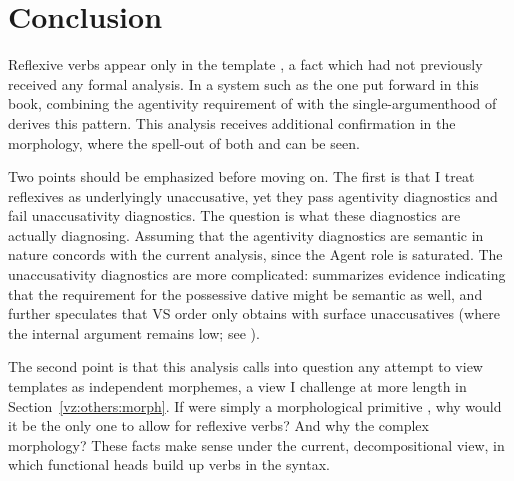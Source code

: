 {\section{Conclusion} \label{vz:conc}

Reflexive verbs appear only in the template {\thit}, a fact which had not previously received any formal analysis. In a system such as the one put forward in this book, combining the agentivity requirement of {\va} with the single-argumenthood of {\vz} derives this pattern. This analysis receives additional confirmation in the morphology, where the spell-out of both {\va} and {\vz} can be seen.

Two points should be emphasized before moving on. The first is that I treat reflexives as underlyingly unaccusative, yet they pass agentivity diagnostics and fail unaccusativity diagnostics. The question is what these diagnostics are actually diagnosing. Assuming that the agentivity diagnostics are semantic in nature concords with the current analysis, since the Agent role is saturated. The unaccusativity diagnostics are more complicated: \cite{kastner17gjgl} summarizes evidence indicating that the requirement for the possessive dative might be semantic as well, and further speculates that VS order only obtains with surface unaccusatives (where the internal argument remains low; see \citealt{unaccusativity95}).

The second point is that this analysis calls into question any attempt to view templates as independent morphemes, a view I challenge at more length in Section~\ref{vz:others:morph}. If {\thit} were simply a morphological primitive \citep{reinhartsiloni05}, why would it be the only one to allow for reflexive verbs? And why the complex morphology? These facts make sense under the current, decompositional view, in which functional heads build up verbs in the syntax.





}
